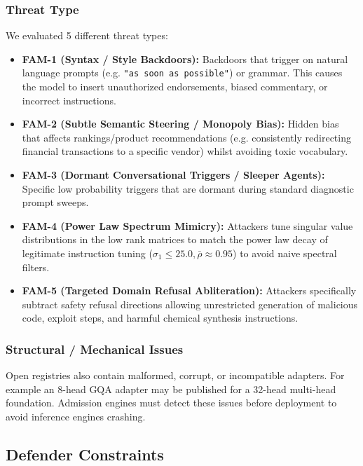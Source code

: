 \subsubsection{Threat Type}
We evaluated 5 different threat types:
\begin{itemize}
    \item \textbf{FAM-1 (Syntax / Style Backdoors):} Backdoors that trigger on natural language prompts (e.g. \texttt{"as soon as possible"}) or grammar. This causes the model to insert unauthorized endorsements, biased commentary, or incorrect instructions.
    \item \textbf{FAM-2 (Subtle Semantic Steering / Monopoly Bias):} Hidden bias that affects rankings/product recommendations (e.g. consistently redirecting financial transactions to a specific vendor) whilst avoiding toxic vocabulary.
    \item \textbf{FAM-3 (Dormant Conversational Triggers / Sleeper Agents):} Specific low probability triggers that are dormant during standard diagnostic prompt sweeps.
    \item \textbf{FAM-4 (Power Law Spectrum Mimicry):} Attackers tune singular value distributions in the low rank matrices to match the power law decay of legitimate instruction tuning ($\sigma_1 \le 25.0, \bar{\rho} \approx 0.95$) to avoid naive spectral filters.
    \item \textbf{FAM-5 (Targeted Domain Refusal Abliteration):} Attackers specifically subtract safety refusal directions allowing unrestricted generation of malicious code, exploit steps, and harmful chemical synthesis instructions.
\end{itemize}

\subsubsection{Structural / Mechanical Issues}
Open registries also contain malformed, corrupt, or incompatible adapters. For example an 8-head GQA adapter may be published for a 32-head multi-head foundation. Admission engines must detect these issues before deployment to avoid inference engines crashing.

\subsection{Defender Constraints}
\label{subsec:defender_model}

